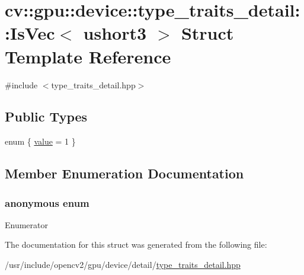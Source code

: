 \hypertarget{structcv_1_1gpu_1_1device_1_1type__traits__detail_1_1IsVec_3_01ushort3_01_4}{\section{cv\-:\-:gpu\-:\-:device\-:\-:type\-\_\-traits\-\_\-detail\-:\-:Is\-Vec$<$ ushort3 $>$ Struct Template Reference}
\label{structcv_1_1gpu_1_1device_1_1type__traits__detail_1_1IsVec_3_01ushort3_01_4}
}


{\ttfamily \#include $<$type\-\_\-traits\-\_\-detail.\-hpp$>$}

\subsection*{Public Types}
\begin{DoxyCompactItemize}
\item 
enum \{ \hyperlink{structcv_1_1gpu_1_1device_1_1type__traits__detail_1_1IsVec_3_01ushort3_01_4_abe88902a04f79bf396792a41bfc93cd2a04247d7549b06302f24c3b99bc7f162a}{value} = 1
 \}
\end{DoxyCompactItemize}


\subsection{Member Enumeration Documentation}
\hypertarget{structcv_1_1gpu_1_1device_1_1type__traits__detail_1_1IsVec_3_01ushort3_01_4_abe88902a04f79bf396792a41bfc93cd2}{\subsubsection[{anonymous enum}]{\setlength{\rightskip}{0pt plus 5cm}anonymous enum}}\label{structcv_1_1gpu_1_1device_1_1type__traits__detail_1_1IsVec_3_01ushort3_01_4_abe88902a04f79bf396792a41bfc93cd2}
\begin{Desc}
\item[Enumerator]\par
\begin{description}
\item[{\em 
\hypertarget{structcv_1_1gpu_1_1device_1_1type__traits__detail_1_1IsVec_3_01ushort3_01_4_abe88902a04f79bf396792a41bfc93cd2a04247d7549b06302f24c3b99bc7f162a}{value}\label{structcv_1_1gpu_1_1device_1_1type__traits__detail_1_1IsVec_3_01ushort3_01_4_abe88902a04f79bf396792a41bfc93cd2a04247d7549b06302f24c3b99bc7f162a}
}]\end{description}
\end{Desc}


The documentation for this struct was generated from the following file\-:\begin{DoxyCompactItemize}
\item 
/usr/include/opencv2/gpu/device/detail/\hyperlink{type__traits__detail_8hpp}{type\-\_\-traits\-\_\-detail.\-hpp}\end{DoxyCompactItemize}
